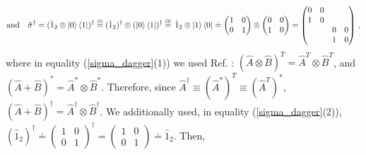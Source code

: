 \documentclass[11pt]{article}
\numberwithin{equation}{section} %
\numberwithin{figure}{section} %
\newcommand\numeq[1] %
  {\stackrel{\scriptscriptstyle(\mkern-1.5mu#1\mkern-1.5mu)}{=}}
\begin{document}
\begin{appendices}
\begin{equation}
\textrm{and}\quad\hat{\sigma}^\dagger=(\hat{1}_2\otimes\ket{0}\bra{1})^\dagger\numeq{\textrm{1}}(\hat{1}_2)^\dagger\otimes(\ket{0}\bra{1})^\dagger\numeq{\textrm{2}}\,\hat{1}_2\otimes\ket{1}\bra{0}\doteq \begin{pmatrix}1&0\\0&1\end{pmatrix}\otimes\begin{pmatrix}0&0\\1&0\end{pmatrix}=\begin{pmatrix}0&0&&\\1&0&&\\&&0&0\\&&1&0\end{pmatrix}\,\textrm{,}
\end{equation}
where in equality (\ref{sigma_dagger}(1)) we used Ref. \cite[p.~74, Eq.~(2.53)]{Nielsen}: $(\hat{A}\otimes\hat{B})^T=\hat{A}^T\otimes\hat{B}^T$, and $(\hat{A}+\hat{B})^*=\hat{A}^*\otimes\hat{B}^*$. Therefore, since $\hat{A}^\dagger\equiv(\hat{A}^*)^T\equiv(\hat{A}^T)^*$, $(\hat{A}+\hat{B})^\dagger=\hat{A}^\dagger\otimes\hat{B}^\dagger$. We additionally used, in equality (\ref{sigma_dagger}(2)),  $(\hat{1}_2)^\dagger\doteq\begin{pmatrix}1&0\\0&1\end{pmatrix}^\dagger=\begin{pmatrix}1&0\\0&1\end{pmatrix}\doteq\hat{1}_2$. Then, 


\end{appendices}
\end{document}
